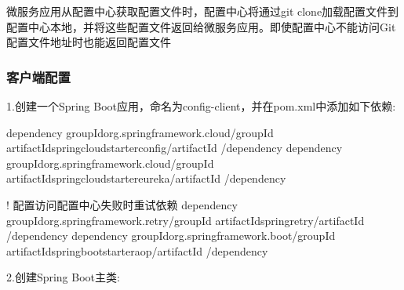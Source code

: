 \documentclass[letterpaper,10pt,english]{sphinxmanual}
\begin{document}
微服务应用从配置中心获取配置文件时，配置中心将通过git clone加载配置文件到配置中心本地，并将这些配置文件返回给微服务应用。即使配置中心不能访问Git配置文件地址时也能返回配置文件


\subsubsection{客户端配置}
\label{\detokenize{01.spring-cloud/05.config/config_01:id3}}
1.创建一个Spring Boot应用，命名为config-client，并在pom.xml中添加如下依赖:

\begin{sphinxVerbatim}[commandchars=\\\{\}]
\PYGZlt{}dependency\PYGZgt{}
    \PYGZlt{}groupId\PYGZgt{}org.springframework.cloud\PYGZlt{}/groupId\PYGZgt{}
    \PYGZlt{}artifactId\PYGZgt{}spring\PYGZhy{}cloud\PYGZhy{}starter\PYGZhy{}config\PYGZlt{}/artifactId\PYGZgt{}
\PYGZlt{}/dependency\PYGZgt{}
\PYGZlt{}dependency\PYGZgt{}
    \PYGZlt{}groupId\PYGZgt{}org.springframework.cloud\PYGZlt{}/groupId\PYGZgt{}
    \PYGZlt{}artifactId\PYGZgt{}spring\PYGZhy{}cloud\PYGZhy{}starter\PYGZhy{}eureka\PYGZlt{}/artifactId\PYGZgt{}
\PYGZlt{}/dependency\PYGZgt{}

\PYGZlt{}!\PYGZhy{}\PYGZhy{} 配置访问配置中心失败时重试依赖 \PYGZhy{}\PYGZhy{}\PYGZgt{}
\PYGZlt{}dependency\PYGZgt{}
    \PYGZlt{}groupId\PYGZgt{}org.springframework.retry\PYGZlt{}/groupId\PYGZgt{}
    \PYGZlt{}artifactId\PYGZgt{}spring\PYGZhy{}retry\PYGZlt{}/artifactId\PYGZgt{}
\PYGZlt{}/dependency\PYGZgt{}
\PYGZlt{}dependency\PYGZgt{}
    \PYGZlt{}groupId\PYGZgt{}org.springframework.boot\PYGZlt{}/groupId\PYGZgt{}
    \PYGZlt{}artifactId\PYGZgt{}spring\PYGZhy{}boot\PYGZhy{}starter\PYGZhy{}aop\PYGZlt{}/artifactId\PYGZgt{}
\PYGZlt{}/dependency\PYGZgt{}
\end{sphinxVerbatim}

2.创建Spring Boot主类:

\begin{sphinxVerbatim}[commandchars=\\\{\}]
   

       \PYG{p}{[}\PYG{p}{]}  
         

\end{sphinxVerbatim}
\end{document}
